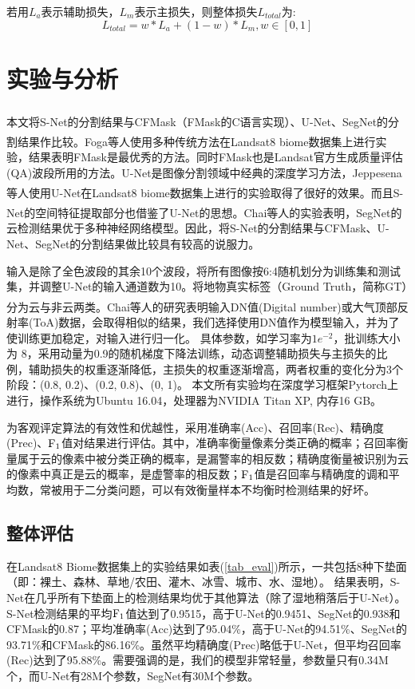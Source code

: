 \documentclass[10pt,UTF8,fntef]{ctexart}
\newcommand{\upcite}[1]{\textsuperscript{\textsuperscript{\cite{#1}}}}
\begin{document}
\begin{multicols}{2}
若用$L_{a}$表示辅助损失，$L_{m}$表示主损失，则整体损失$L_{total}$为:
\begin{equation}
    L_{total}=w*L_{a}+(1-w)*L_{m}, w \in [0, 1]
\end{equation}


\section[]{实验与分析}

本文将S-Net的分割结果与CFMask（FMask\upcite{zhu2012object}的C语言实现）、U-Net\upcite{ronneberger2015unet}、SegNet\upcite{badrinarayanan2015segnet}的分割结果作比较。Foga等人\upcite{foga2017cloud_data}使用多种传统方法在Landsat8 biome数据集上进行实验，结果表明FMask是最优秀的方法。同时FMask也是Landsat官方生成质量评估(QA)波段所用的方法。U-Net是图像分割领域中经典的深度学习方法，Jeppesena等人\upcite{jeppesen2019cloud}使用U-Net在Landsat8 biome数据集上进行的实验取得了很好的效果。而且S-Net的空间特征提取部分也借鉴了U-Net的思想。Chai等人\upcite{chai2019cloud}的实验表明，SegNet的云检测结果优于多种神经网络模型。因此，将S-Net的分割结果与CFMask、U-Net、SegNet的分割结果做比较具有较高的说服力。

输入是除了全色波段的其余10个波段，将所有图像按6:4随机划分为训练集和测试集，并调整U-Net的输入通道数为10。将地物真实标签（Ground Truth，简称GT）分为云与非云两类。Chai等人\upcite{chai2019cloud}的研究表明输入DN值(Digital number)或大气顶部反射率(ToA)数据，会取得相似的结果，我们选择使用DN值作为模型输入，并为了使训练更加稳定，对输入进行归一化。
具体参数，如学习率为$1e^{-2}$，批训练大小为 8，采用动量为0.9的随机梯度下降法训练，动态调整辅助损失与主损失的比例，辅助损失的权重逐渐降低，主损失的权重逐渐增高，两者权重的变化分为3个阶段：(0.8, 0.2)、(0.2, 0.8)、(0, 1)。
本文所有实验均在深度学习框架Pytorch上进行，操作系统为Ubuntu 16.04，处理器为NVIDIA Titan XP, 内存16 GB。

为客观评定算法的有效性和优越性，采用准确率(Acc)、召回率(Rec)、精确度(Prec)、$\rm F_1$值对结果进行评估。其中，准确率衡量像素分类正确的概率；召回率衡量属于云的像素中被分类正确的概率，是漏警率的相反数；精确度衡量被识别为云的像素中真正是云的概率，是虚警率的相反数；$\rm F_1$值是召回率与精确度的调和平均数，常被用于二分类问题，可以有效衡量样本不均衡时检测结果的好坏。

\subsection{整体评估}
在Landsat8 Biome数据集上的实验结果如表(\ref{tab_eval})所示，一共包括8种下垫面（即：裸土、森林、草地/农田、灌木、冰雪、城市、水、湿地）。
结果表明，S-Net在几乎所有下垫面上的检测结果均优于其他算法（除了湿地稍落后于U-Net）。S-Net检测结果的平均$\rm F_1$值达到了0.9515，高于U-Net的0.9451、{\color{red}SegNet的0.938}和CFMask的0.87；平均准确率(Acc)达到了95.04\%，高于U-Net的94.51\%、{\color{red}SegNet的93.71\%}和CFMask的86.16\%。虽然平均精确度(Prec)略低于U-Net，但平均召回率(Rec)达到了95.88\%。需要强调的是，我们的模型非常轻量，参数量只有0.34M个，而U-Net有28M个参数，SegNet有30M个参数。


\end{multicols}
\end{document}

